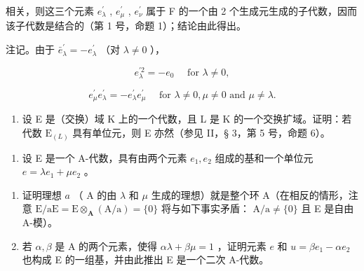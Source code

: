 相关，则这三个元素 \(e_{\lambda}^{\prime}\) , \(e_{\mu}^{\prime}\) , \(e_{\nu}^{\prime}\) 属于 F 的一个由 2 个生成元生成的子代数，因而该子代数是结合的（第 1 号，命题 1）；结论由此得出。

注记。由于 \(\bar{e}_{\lambda}^{\prime} = -e_{\lambda}^{\prime}\) （对 \(\lambda \neq 0\) ），

\[
e _ {\lambda} ^ {\prime 2} = - e _ {0} \quad \text { for } \lambda \neq 0,
\]

\[
e _ {\mu} ^ {\prime} e _ {\lambda} ^ {\prime} = - e _ {\lambda} ^ {\prime} e _ {\mu} ^ {\prime} \quad \text { for } \lambda \neq 0, \mu \neq 0 \text { and } \mu \neq \lambda .
\]

\BourbakiExercisesHeading

\BourbakiExercisesSection

\begin{enumerate}
\def\labelenumi{\arabic{enumi}.}
\tightlist
\item
  设 E 是（交换）域 K 上的一个代数，且 L 是 K 的一个交换扩域。证明：若代数 \(\mathrm{E}_{(L)}\) 具有单位元，则 E 亦然（参见 II，§ 3，第 5 号，命题 6）。
\end{enumerate}

\BourbakiExercisesSection

\begin{enumerate}
\def\labelenumi{\arabic{enumi}.}
\tightlist
\item
  设 E 是一个 A-代数，具有由两个元素 \(e_1, e_2\) 组成的基和一个单位元 \(e = \lambda e_1 + \mu e_2\) 。
\end{enumerate}

\begin{enumerate}
\def\labelenumi{(\alph{enumi})}
\item
  证明理想 \(a\) （ A 的由 \(\lambda\) 和 \(\mu\) 生成的理想）就是整个环 A（在相反的情形，注意 \(\mathrm{E} / \mathrm{aE} = \mathrm{E} \otimes_{\mathbf{A}} (\mathrm{A} / \mathrm{a}) = \{0\}\) 将与如下事实矛盾： \(\mathrm{A} / \mathrm{a} \neq \{0\}\) 且 E 是自由 A-模）。
\item
  若 \(\alpha, \beta\) 是 A 的两个元素，使得 \(\alpha\lambda + \beta\mu = 1\) ，证明元素 \(e\) 和 \(u = \beta e_1 - \alpha e_2\) 也构成 E 的一组基，并由此推出 E 是一个二次 A-代数。
\end{enumerate}

